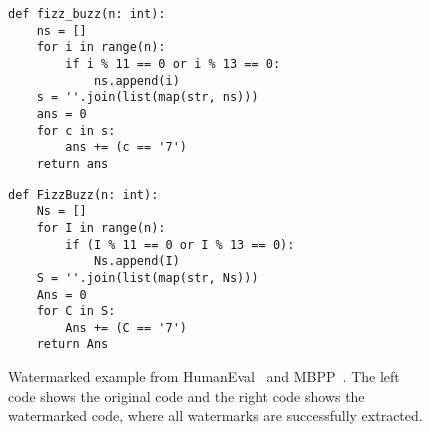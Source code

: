 \begin{figure*}[!ht]
    \begin{minipage}{0.47\textwidth}
 \begin{lstlisting}[basicstyle=\ttfamily\tiny,numbers=none,caption=Original code \#4]
def fizz_buzz(n: int):
    ns = []
    for i in range(n):
        if i % 11 == 0 or i % 13 == 0:
            ns.append(i)
    s = ''.join(list(map(str, ns)))
    ans = 0
    for c in s:
        ans += (c == '7')            
    return ans
\end{lstlisting}
    \end{minipage}
    \hfill
    \begin{minipage}{0.47\textwidth}
        \begin{lstlisting}[basicstyle=\ttfamily\tiny,numbers=none,caption=Watermarked code \#4]
def FizzBuzz(n: int):
    Ns = []
    for I in range(n):
        if (I % 11 == 0 or I % 13 == 0):
            Ns.append(I)
    S = ''.join(list(map(str, Ns)))
    Ans = 0
    for C in S:
        Ans += (C == '7')
    return Ans
        \end{lstlisting} 
    \end{minipage} 
\vspace{-10pt}
    \caption{Watermarked example from HumanEval~\cite{chen2021codex} and MBPP~\cite{austin2021program}. The left code shows the original code and the right code shows the watermarked code, where all watermarks are successfully extracted.}
    \label{fig:append_example}
    \vspace{-10pt}
\end{figure*}

